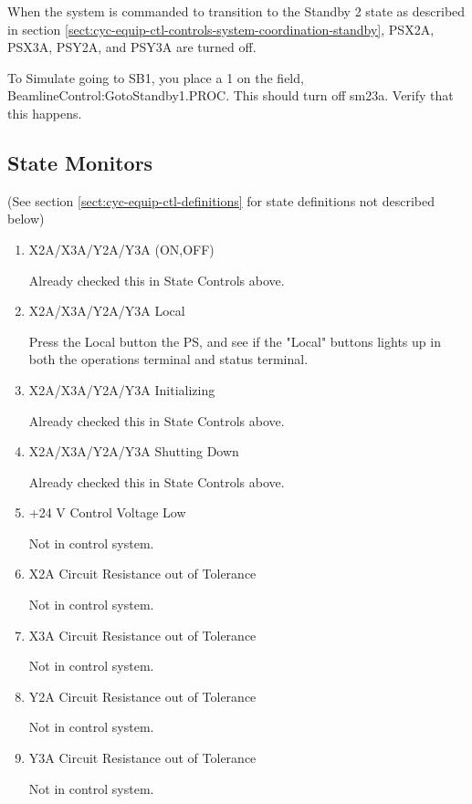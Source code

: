 \documentclass[11pt]{book}		%
\begin{document}
When the system is commanded to transition to the Standby 2 state as described in section \ref{sect:cyc-equip-ctl-controls-system-coordination-standby}, PSX2A, PSX3A, PSY2A, and PSY3A are turned off.

\color{red}

To Simulate going to SB1, you place a 1 on the field, BeamlineControl:GotoStandby1.PROC. This should turn off sm23a.  Verify that this happens.

\color{black}


\subsection{State Monitors} \label{sect:cyc-equip-ctl-beamline-sm23a-state-monitors}
(See section \ref{sect:cyc-equip-ctl-definitions} for state definitions not described below)

\begin{enumerate}

\item X2A/X3A/Y2A/Y3A (ON,OFF)

\color{red}
Already checked this in State Controls above.
\color{black}

\item X2A/X3A/Y2A/Y3A Local

\color{red}
Press the Local button the PS, and see if the "Local" buttons lights up in both the operations terminal and status terminal.
\color{black}

\item X2A/X3A/Y2A/Y3A Initializing

\color{red}
Already checked this in State Controls above.
\color{black}

 \item X2A/X3A/Y2A/Y3A Shutting Down

\color{red}
Already checked this in State Controls above.
\color{black}

\item +24 V Control Voltage Low

\color{red}
Not in control system.
\color{black}

\item X2A Circuit Resistance out of Tolerance

\color{red}
Not in control system.
\color{black} 

\item X3A Circuit Resistance out of Tolerance

\color{red}
Not in control system.
\color{black} 

\item Y2A Circuit Resistance out of Tolerance

\color{red}
Not in control system.
\color{black} 

\item Y3A Circuit Resistance out of Tolerance

\color{red}
Not in control system.
\color{black}

\end{enumerate}
\end{document}
